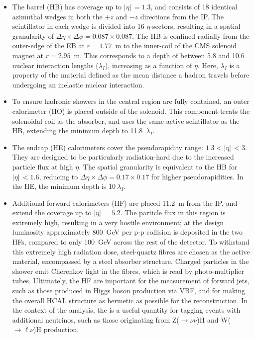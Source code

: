 \begin{itemize}
    \item The barrel (HB) has coverage up to $|\eta|\,=1.3$, and consists of 18 identical azimuthal wedges in both the $+z$ and $-z$ directions from the IP. The scintillator in each wedge is divided into 16 $\eta$-sectors, resulting in a spatial granularity of ${\Delta\eta\times\Delta\phi=0.087\times0.087}$. The HB is confined radially from the outer-edge of the EB at $r=1.77$~m to the inner-coil of the CMS solenoid magnet at $r=2.95$~m. This corresponds to a depth of between 5.8 and 10.6 nuclear interaction lengths ($\lambda_I$), increasing as a function of $\eta$. Here, $\lambda_I$ is a property of the material defined as the mean distance a hadron travels before undergoing an inelastic nuclear interaction.
    \item To ensure hadronic showers in the central region are fully contained, an outer calorimeter (HO) is placed outside of the solenoid. This component treats the solenoidal coil as the absorber, and uses the same active scintillator as the HB, extending the minimum depth to 11.8~$\lambda_I$.
    \item The endcap (HE) calorimeters cover the pseudorapidity range: $1.3<|\eta|\,<3$. They are designed to be particularly radiation-hard due to the increased particle flux at high $\eta$. The spatial granularity is equivalent to the HB for $|\eta|\,<1.6$, reducing to ${\Delta\eta\times\Delta\phi=0.17\times0.17}$ for higher pseudorapidities. In the HE, the minimum depth is 10$~\lambda_I$.
    \item Additional forward calorimeters (HF) are placed 11.2~m from the IP, and extend the coverage up to $|\eta|\,=5.2$. The particle flux in this region is extremely high, resulting in a very hostile environment; at the design luminosity approximately 800~GeV per p-p collision is deposited in the two HFs, compared to only 100~GeV across the rest of the detector. To withstand this extremely high radiation dose, steel-quartz fibres are chosen as the active material, encompassed by a steel absorber structure. Charged particles in the shower emit Cherenkov light in the fibres, which is read by photo-multiplier tubes. Ultimately, the HF are important for the measurement of forward jets, such as those produced in Higgs boson production via VBF, and for making the overall HCAL structure as hermetic as possible for the \met reconstruction. In the context of the \Hgg analysis, the \met is a useful quantity for tagging events with additional neutrinos, such as those originating from Z($\rightarrow\nu\nu$)H and W($\rightarrow \ell\nu$)H production.
\end{itemize}

